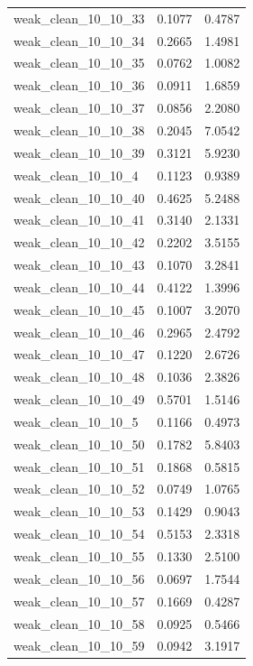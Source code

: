 \begin{longtable}{lcc}
weak\_clean\_10\_10\_33    &   0.1077 &  0.4787 \\
weak\_clean\_10\_10\_34    &   0.2665 &  1.4981 \\
weak\_clean\_10\_10\_35    &   0.0762 &  1.0082 \\
weak\_clean\_10\_10\_36    &   0.0911 &  1.6859 \\
weak\_clean\_10\_10\_37    &   0.0856 &  2.2080 \\
weak\_clean\_10\_10\_38    &   0.2045 &  7.0542 \\
weak\_clean\_10\_10\_39    &   0.3121 &  5.9230 \\
weak\_clean\_10\_10\_4     &   0.1123 &  0.9389 \\
weak\_clean\_10\_10\_40    &   0.4625 &  5.2488 \\
weak\_clean\_10\_10\_41    &   0.3140 &  2.1331 \\
weak\_clean\_10\_10\_42    &   0.2202 &  3.5155 \\
weak\_clean\_10\_10\_43    &   0.1070 &  3.2841 \\
weak\_clean\_10\_10\_44    &   0.4122 &  1.3996 \\
weak\_clean\_10\_10\_45    &   0.1007 &  3.2070 \\
weak\_clean\_10\_10\_46    &   0.2965 &  2.4792 \\
weak\_clean\_10\_10\_47    &   0.1220 &  2.6726 \\
weak\_clean\_10\_10\_48    &   0.1036 &  2.3826 \\
weak\_clean\_10\_10\_49    &   0.5701 &  1.5146 \\
weak\_clean\_10\_10\_5     &   0.1166 &  0.4973 \\
weak\_clean\_10\_10\_50    &   0.1782 &  5.8403 \\
weak\_clean\_10\_10\_51    &   0.1868 &  0.5815 \\
weak\_clean\_10\_10\_52    &   0.0749 &  1.0765 \\
weak\_clean\_10\_10\_53    &   0.1429 &  0.9043 \\
weak\_clean\_10\_10\_54    &   0.5153 &  2.3318 \\
weak\_clean\_10\_10\_55    &   0.1330 &  2.5100 \\
weak\_clean\_10\_10\_56    &   0.0697 &  1.7544 \\
weak\_clean\_10\_10\_57    &   0.1669 &  0.4287 \\
weak\_clean\_10\_10\_58    &   0.0925 &  0.5466 \\
weak\_clean\_10\_10\_59    &   0.0942 &  3.1917 \\

\end{longtable}
